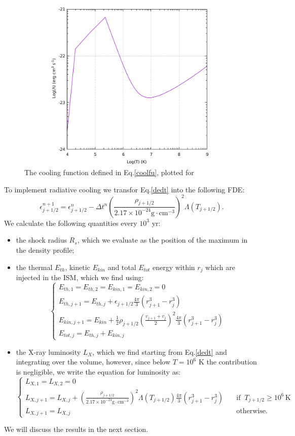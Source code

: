 \documentclass{article}
\begin{document}
\begin{figure}[H]
	\centering
	\includegraphics[width=0.7 \linewidth]{coolfunction.pdf}
	\caption{The cooling function defined in Eq.\eqref{coolfu}, plotted for}
	\label{fig:coolf}
\end{figure}
To implement radiative cooling we transfor Eq.\eqref{dedt} into the following FDE:
\begin{equation}
	\epsilon^{n+1}_{j+1/2}=\epsilon^{n}_{j+1/2}-\Delta t^n\left(\frac{\rho_{j+1/2}}{2.17\times 10^{-24}\text{g}\cdot\text{cm}^{-3}}\right)^2\Lambda(T_{j+1/2}).
\end{equation}
We calculate the following quantities every $10^3$ yr:
\begin{itemize}
	\item the shock radius $R_s$, which we evaluate as the position of the maximum in the density profile;
	\item the thermal $E_{th}$, kinetic $E_{kin}$ and total $E_{tot}$ energy within $r_j$ which are injected in the ISM, which we find using:
			\begin{equation}
				\begin{cases}
					E_{th,1}=E_{th,2}=E_{kin,1}=E_{kin,2}=0\\
					E_{th,j+1}=E_{th,j}+\epsilon_{j+1/2}\frac{4\pi}{3}(r_{j+1}^3-r^3_j)\\
					E_{kin,j+1}=E_{kin}+\frac{1}{2}\rho_{j+1/2}\left(\frac{v_{j+1}+v_j}{2}\right)^2\frac{4\pi}{3}(r_{j+1}^3-r^3_j)\\
					E_{tot,j}=E_{th,j}+E_{kin,j}
				\end{cases}
			\end{equation} 
	\item the X-ray luminosity $L_X$, which we find starting from Eq.\eqref{dedt} and integrating over the volume, however, since below $T=10^6$ K the contribution is negligible, we write the equation for luminosity as:
	\begin{equation}
		\begin{cases}
			L_{X,1}=L_{X,2}=0\\
			L_{X,j+1}=L_{X,j}+\left(\frac{\rho_{j+1/2}}{2.17\times 10^{-24}\text{g}\cdot\text{cm}^{-3}}\right)^2\Lambda(T_{j+1/2})\frac{4\pi}{3}(r_{j+1}^3-r^3_j)\quad &\text{if} \; \;T_{j+1/2}\ge10^6\,\text{K}\\
			L_{X,j+1}=L_{X,j} &\text{otherwise}.
		\end{cases}
	\end{equation} 
\end{itemize}
We will discuss the results in the next section.
\end{document}
